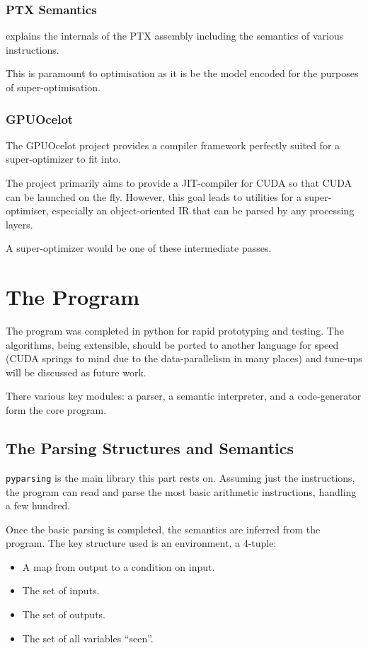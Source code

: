 \documentclass[letterpaper,twocolumn,10pt]{article}
\begin{document}
\subsubsection{PTX Semantics}

\cite{PTXDoc} explains the internals of the PTX
assembly including the semantics of various
instructions.

This is paramount to optimisation as it is
be the model encoded for the purposes of
super-optimisation.

\subsubsection{GPUOcelot}

The GPUOcelot project \cite{GPUOcelot} provides
a compiler framework perfectly suited for a super-optimizer
to fit into.

The project primarily aims to provide a JIT-compiler for CUDA
so that CUDA can be launched on the fly. However, this goal
leads to utilities for a super-optimiser, especially an object-oriented
IR that can be parsed by any processing layers.

A super-optimizer would be one of these intermediate passes.

\section{The Program}

The program was completed in python for rapid prototyping and testing.
The algorithms, being extensible, should be ported to another language
for speed (CUDA springs to mind due to the data-parallelism in many places)
and tune-ups will be discussed as future work.

There various key modules: a parser, a semantic interpreter, and a code-generator
form the core program.

\subsection{The Parsing Structures and Semantics}

\texttt{pyparsing} is the main library this part rests on.
Assuming just the instructions, the program can read and parse
the most basic arithmetic instructions, handling a few hundred.

Once the basic parsing is completed, the semantics are inferred from the program.
The key structure used is an environment, a 4-tuple:
\begin{itemize}
    \item A map from output to a condition on input.
    \item The set of inputs.
    \item The set of outputs.
    \item The set of all variables ``seen''.
\end{itemize}
\end{document}
